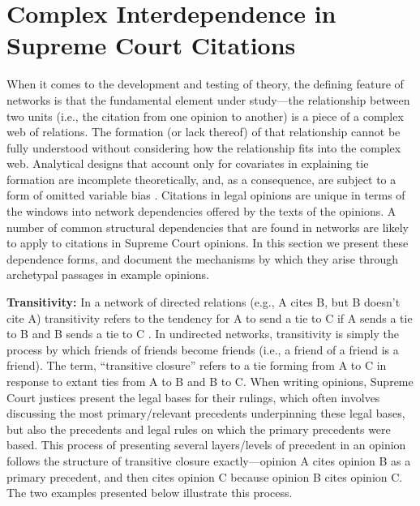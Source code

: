 \documentclass[headsepline=true, abstracton]{scrartcl}
\begin{document}
\section{Complex Interdependence in Supreme Court Citations}

When it comes to the development and testing of theory, the defining feature of networks is that the fundamental element under study---the relationship between two units (i.e., the citation from one opinion to another) is a piece of a complex web of relations. The formation (or lack thereof) of that relationship cannot be fully understood without considering how the relationship fits into the complex web. Analytical designs that account only for covariates in explaining tie formation are incomplete theoretically, and, as a consequence, are subject to a form of omitted variable bias \citep{cranmer2016critique}. Citations in legal opinions are unique in terms of the windows into network dependencies offered by the texts of the opinions. A number of common structural dependencies that are found in networks are likely to apply to citations in Supreme Court opinions. In this section we present these dependence forms, and document the mechanisms by which they arise through archetypal passages in example opinions. 

\textbf{Transitivity:} In a network of directed relations (e.g., A cites B, but B doesn't cite A) transitivity refers to the tendency for A to send a tie to C if A sends a tie to B and B sends a tie to C \citep{holland1971transitivity}. In undirected networks, transitivity is simply the process by which friends of friends become friends (i.e., a friend of a friend is a friend). The term, ``transitive closure'' refers to a tie forming from A to C in response to extant ties from A to B and B to C. When writing opinions, Supreme Court justices present the legal bases for their rulings, which often involves discussing the most primary/relevant precedents underpinning these legal bases, but also the precedents and legal rules on which the primary precedents were based. This process of presenting several layers/levels of precedent in an opinion follows the structure of transitive closure exactly---opinion A cites opinion B as a primary precedent, and then cites opinion C because opinion B cites opinion C. The two examples presented below illustrate this process.
\end{document}
